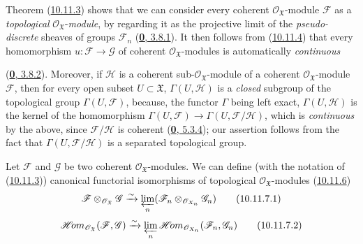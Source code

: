 \begin{env}[10.11.6]
\label{I.10.11.6}
Theorem (\hyperref[I.10.11.3]{10.11.3}) shows that we can consider
every coherent $\mathscr{O}_{\mathfrak{X}}$-module $\mathscr{F}$ as
a \emph{topological} $\mathscr{O}_{\mathfrak{X}}$-\emph{module}, by
regarding it as the projective limit of the \emph{pseudo-discrete}
sheaves of groups $\mathscr{F}_n$
(\hyperref[0.3.8.1]{\textbf{0}, 3.8.1}). It then follows from
(\hyperref[I.10.11.4]{10.11.4}) that every homomorphism
$u:\mathscr{F}\to\mathscr{G}$ of
coherent $\mathscr{O}_{\mathfrak{X}}$-modules is automatically
\emph{continuous}


(\hyperref[0.3.8.2]{\textbf{0}, 3.8.2}). Moreover, if $\mathscr{H}$ is a
coherent sub-$\mathscr{O}_{\mathfrak{X}}$-module of a
coherent $\mathscr{O}_{\mathfrak{X}}$-module $\mathscr{F}$, then for every
open subset $U\subset\mathfrak{X}$, $\Gamma(U,\mathscr{H})$ is a \emph{closed}
subgroup of the topological group $\Gamma(U,\mathscr{F})$, because, the functor
$\Gamma$ being left exact, $\Gamma(U,\mathscr{H})$ is the kernel of
the homomorphism
$\Gamma(U,\mathscr{F})\to\Gamma(U,\mathscr{F}/\mathscr{H})$, which is
\emph{continuous} by the above, since $\mathscr{F}/\mathscr{H}$
is coherent (\hyperref[0.5.3.4]{\textbf{0}, 5.3.4}); our assertion follows
from the fact that $\Gamma(U,\mathscr{F}/\mathscr{H})$ is a separated
topological group.
\end{env}

\begin{proposition}[10.11.7]
\label{I.10.11.7}
Let $\mathscr{F}$ and $\mathscr{G}$ be two coherent
$\mathscr{O}_{\mathfrak{X}}$-modules. We can define \textup{(with the
notation of (\hyperref[I.10.11.3]{10.11.3}))} canonical functorial
isomorphisms of topological $\mathscr{O}_{\mathfrak{X}}$-modules
\textup{(\hyperref[I.10.11.6]{10.11.6})}
\[
  \label{I.10.11.7.1}
  \mathscr{F}\otimes_{\mathscr{O}_{\mathfrak{X}}}\mathscr{G}
  \xrightarrow{\sim}
  \varprojlim_n
  (\mathscr{F}_n\otimes_{\mathscr{O}_{X_n}}\mathscr{G}_n)
  \tag{10.11.7.1}
\]
\[
  \label{I.10.11.7.2}
  \mathscr{H}\!om_{\mathscr{O}_{\mathfrak{X}}}
  (\mathscr{F},\mathscr{G})
  \xrightarrow{\sim}
  \varprojlim_n
  \mathscr{H}\!om_{\mathscr{O}_{X_n}}(\mathscr{F}_n,\mathscr{G}_n)
  \tag{10.11.7.2}
\]
\end{proposition}

